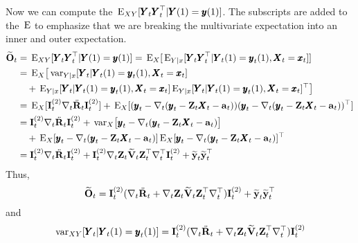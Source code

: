 \documentclass[]{article}
\def\XI{\mbox{\boldmath $\Xi$}}
\def\E{\,\textup{\textrm{E}}}
\def\IIm{\mbox{$\mathbf I$}}
\def\OO{\mbox{$\mathbf O$}}
\def\RR{\mbox{$\mathbf R$}}	 \def\rr{\mbox{$\mathbf r$}} \def\Rb{\mbox{$\mathbf H$}}	\def\Rm{\mathbb{R}}
\def\VV{\mbox{$\mathbf V$}}	\def\vv{\mbox{$\mathbf v$}}
\def\XX{\mbox{$\pmb{X}$}}	\def\xx{\mbox{$\pmb{x}$}}
\def\YY{\mbox{$\pmb{Y}$}}	\def\yy{\mbox{$\pmb{y}$}}
\def\ZZ{\mbox{$\mathbf Z$}}	\def\zz{\mbox{$\mathbf z$}}	\def\Zb{\mbox{$\mathbf M$}} \def\Za{\mbox{$\mathbf N$}} \def\Zm{\XI}
\def\var{\,\textup{\textrm{var}}}
\def\hatyt{\widetilde{\mbox{$\mathbf y$}}_t}
\def\hatOt{\widetilde{\OO}_t}
\def\hatVt{\widetilde{\VV}_t}
\def\IR{\nabla}
\begin{document}
Now we can compute the $\E_{XY}[\YY_t\YY_t^\top|\YY(1)=\yy(1)]$.  The subscripts are added to the $\E$ to emphasize that we are breaking the multivariate expectation into an inner and outer expectation.
\begin{equation}
\begin{split}
\hatOt&=\E_{XY}[\YY_t\YY_t^\top|\YY(1)=\yy(1)]=\E_X[\E_{Y|x}[\YY_t\YY_t^\top|\YY_t(1)=\yy_t(1),\XX_t=\xx_t]]\\
&=\E_X\bigl[\var_{Y|x}[\YY_t|\YY_t(1)=\yy_t(1),\XX_t=\xx_t] \\
&\quad + \E_{Y|x}[\YY_t|\YY_t(1)=\yy_t(1),\XX_t=\xx_t]
\E_{Y|x}[\YY_t|\YY_t(1)=\yy_t(1),\XX_t=\xx_t]^\top\bigr]\\
&=\E_X[\IIm_t^{(2)}\IR_t\ddot{\RR}_t\IIm_t^{(2)}] +\E_X[(\yy_t-\IR_t(\yy_t-\ZZ_t\XX_t-\aa_t))(\yy_t-\IR_t(\yy_t-\ZZ_t\XX_t-\aa_t))^\top]\\
&=\IIm_t^{(2)}\IR_t\ddot{\RR}_t\IIm_t^{(2)} + \var_X\bigl[\yy_t-\IR_t(\yy_t-\ZZ_t\XX_t-\aa_t)\bigr]\\ &\quad +\E_X[\yy_t-\IR_t(\yy_t-\ZZ_t\XX_t-\aa_t)]\E_X[\yy_t-\IR_t(\yy_t-\ZZ_t\XX_t-\aa_t)]^\top\\
&=\IIm_t^{(2)}\IR_t\ddot{\RR}_t\IIm_t^{(2)}  + \IIm_t^{(2)}\IR_t\ZZ_t\hatVt\ZZ_t^\top\IR_t^\top\IIm_t^{(2)} + \hatyt\hatyt^\top  \\
\end{split}
\end{equation}
Thus,
\begin{equation}
\hatOt=\IIm_t^{(2)}(\IR_t\ddot{\RR}_t + \IR_t\ZZ_t\hatVt\ZZ_t^\top\IR_t^\top)\IIm_t^{(2)}  +  \hatyt\hatyt^\top  \\
\end{equation}
and 
\begin{equation}\label{eq:cond.var.Y}
\var_{XY}[\YY_t|\YY_t(1)=\yy_t(1)] = \IIm_t^{(2)}(\IR_t\ddot{\RR}_t + \IR_t\ZZ_t\hatVt\ZZ_t^\top\IR_t^\top)\IIm_t^{(2)}
\end{equation}
\end{document}
